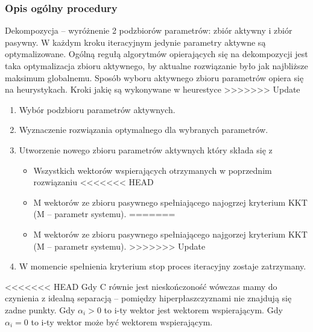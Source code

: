 \documentclass[[10pt,a4paper]{article}
\begin{document}
\subsubsection{Opis ogólny procedury}
Dekompozycja – wyróżnenie 2 podzbiorów parametrów: zbiór aktywny i zbiór pasywny. W każdym kroku iteracyjnym jedynie parametry aktywne są optymalizowane. Ogólną regułą algorytmów opierających się na dekompozycji jest taka optymalizacja zbioru aktywnego, by aktualne rozwiązanie było jak najbliższe maksimum globalnemu. 
Sposób wyboru aktywnego zbioru parametrów opiera się na heurystykach.
\newline
\newline
Kroki jakię są wykonywane w heurestyce
>>>>>>> Update
\begin{enumerate}
\item Wybór podzbioru parametrów aktywnych. 
\item Wyznaczenie rozwiązania optymalnego dla wybranych parametrów.
\item Utworzenie nowego zbioru parametrów aktywnych który składa się z
\begin{itemize}
\item Wszystkich wektorów wspierających otrzymanych w poprzednim rozwiązaniu
<<<<<<< HEAD
\item M wektorów ze zbioru pasywnego spełniającego najogrzej kryterium KKT (M – parametr systemu). 
=======
\item M wektorów ze zbioru pasywnego spełniającego najgorzej kryterium KKT (M – parametr systemu). 
>>>>>>> Update
\end{itemize}
\item W momencie spełnienia kryterium stop proces iteracyjny zostaje zatrzymany. 
\end{enumerate}

<<<<<<< HEAD
Gdy C równie jest nieskończoność wówczas mamy do czynienia z idealną separacją – pomiędzy hiperpłaszczyznami nie znajdują się zadne punkty. 
Gdy $\alpha_{i} > 0 $ to i-ty wektor jest wektorem wspierającym.
Gdy $\alpha_{i} = 0 $ to i-ty wektor może być wektorem wspierającym.
\end{document}
